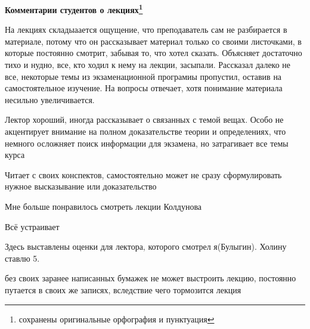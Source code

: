 		\textbf{Комментарии студентов о лекциях\protect\footnote{сохранены оригинальные орфография и пунктуация}}

            \begin{commentbox} 
                На лекциях складыаается ощущение, что преподаватель сам не разбирается в материале, потому что он рассказывает материал только со своими листочками, в которые постоянно смотрит, забывая то, что хотел сказать. Объясняет достаточно тихо и нудно, все, кто ходил к нему на лекции, засыпали. Рассказал далеко не все, некоторые темы из экзаменационной програмиы пропустил, оставив на самостоятельное изучение. На вопросы отвечает, хотя понимание материала несильно увеличивается. 
            \end{commentbox} 
        
            \begin{commentbox} 
                Лектор хороший, иногда рассказывает о связанных с темой вещах. Особо не акцентирует внимание на полном доказательстве теории и определениях, что немного осложняет поиск информации для экзамена, но затрагивает все темы курса 
            \end{commentbox} 
        
            \begin{commentbox} 
                Читает с своих конспектов, самостоятельно может не сразу сформулировать нужное высказывание или доказательство 
            \end{commentbox} 
        
            \begin{commentbox} 
                Мне больше понравилось смотреть лекции Колдунова 
            \end{commentbox} 
        
            \begin{commentbox} 
                Всё устраивает 
            \end{commentbox} 
        
            \begin{commentbox} 
                Здесь выставлены оценки для лектора, которого смотрел я(Булыгин). Холину ставлю 5. 
            \end{commentbox} 
        
            \begin{commentbox} 
                без своих заранее написанных бумажек не может выстроить лекцию, постоянно путается в своих же записях, вследствие чего тормозится лекция 
            \end{commentbox} 
        
